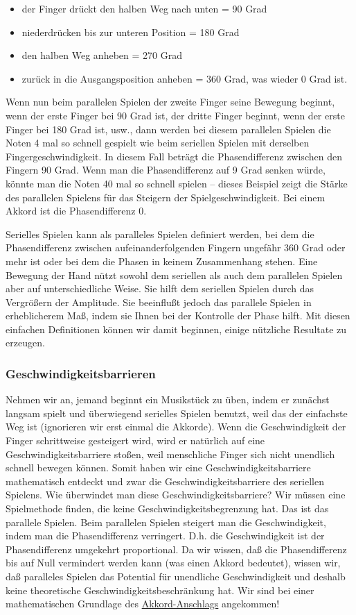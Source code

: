 \begin{itemize} 
 \item der Finger drückt den halben Weg nach unten = 90 Grad
 \item niederdrücken bis zur unteren Position = 180 Grad
 \item den halben Weg anheben = 270 Grad
 \item zurück in die Ausgangsposition anheben = 360 Grad, was wieder 0 Grad ist.
 \end{itemize}
Wenn nun beim parallelen Spielen der zweite Finger seine Bewegung beginnt, wenn der erste Finger bei 90 Grad ist, der dritte Finger beginnt, wenn der erste Finger bei 180 Grad ist, usw., dann werden bei diesem parallelen Spielen die Noten 4 mal so schnell gespielt wie beim seriellen Spielen mit derselben Fingergeschwindigkeit.
In diesem Fall beträgt die Phasendifferenz zwischen den Fingern 90 Grad.
Wenn man die Phasendifferenz auf 9 Grad senken würde, könnte man die Noten 40 mal so schnell spielen -- dieses Beispiel zeigt die Stärke des parallelen Spielens für das Steigern der Spielgeschwindigkeit.
Bei einem Akkord ist die Phasendifferenz 0.

Serielles Spielen kann als paralleles Spielen definiert werden, bei dem die Phasendifferenz zwischen aufeinanderfolgenden Fingern ungefähr 360 Grad oder mehr ist oder bei dem die Phasen in keinem Zusammenhang stehen.
Eine Bewegung der Hand nützt sowohl dem seriellen als auch dem parallelen Spielen aber auf unterschiedliche Weise.
Sie hilft dem seriellen Spielen durch das Vergrößern der Amplitude.
Sie beeinflußt jedoch das parallele Spielen in erheblicherem Maß, indem sie Ihnen bei der Kontrolle der Phase hilft.
Mit diesen einfachen Definitionen können wir damit beginnen, einige nützliche Resultate zu erzeugen.


\subsubsection{Geschwindigkeitsbarrieren}
\label{c1iv2b}

Nehmen wir an, jemand beginnt ein Musikstück zu üben, indem er zunächst langsam spielt und überwiegend serielles Spielen benutzt, weil das der einfachste Weg ist (ignorieren wir erst einmal die Akkorde).
Wenn die Geschwindigkeit der Finger schrittweise gesteigert wird, wird er natürlich auf eine Geschwindigkeitsbarriere stoßen, weil menschliche Finger sich nicht unendlich schnell bewegen können.
Somit haben wir eine Geschwindigkeitsbarriere mathematisch entdeckt und zwar die Geschwindigkeitsbarriere des seriellen Spielens.
Wie überwindet man diese Geschwindigkeitsbarriere?
Wir müssen eine Spielmethode finden, die keine Geschwindigkeitsbegrenzung hat.
Das ist das parallele Spielen.
Beim parallelen Spielen steigert man die Geschwindigkeit, indem man die Phasendifferenz verringert.
D.h. die Geschwindigkeit ist der Phasendifferenz umgekehrt proportional.
Da wir wissen, daß die Phasendifferenz bis auf Null vermindert werden kann (was einen Akkord bedeutet), wissen wir, daß paralleles Spielen das Potential für unendliche Geschwindigkeit und deshalb keine theoretische Geschwindigkeitsbeschränkung hat.
Wir sind bei einer mathematischen Grundlage des \hyperref[c1ii9]{Akkord-Anschlags} angekommen!

